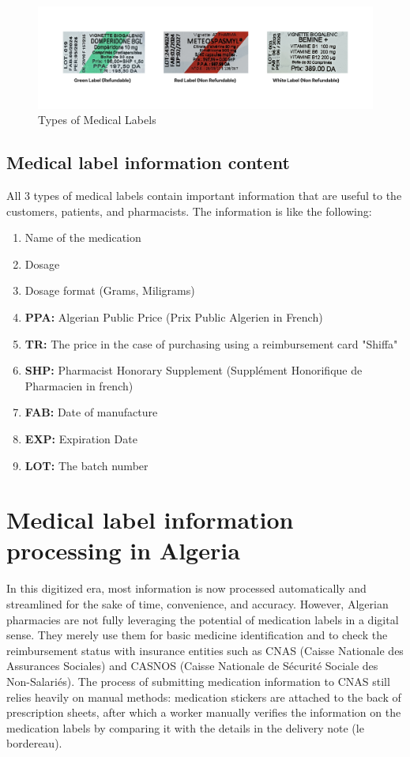 \begin{figure}[H]
    \centering
    \includegraphics[width=\textwidth]{Figures/Chapter 1/labels_types.png}
    \caption{Types of Medical Labels}
    \label{fig:typesofmedicallabels}
\end{figure}

\subsection{Medical label information content}
All 3 types of medical labels contain important information that are useful to the customers, patients, and pharmacists. The information is like the following:

\begin{enumerate}
    \item Name of the medication 
    \item Dosage
    \item Dosage format (Grams, Miligrams)
    \item \textbf{PPA:} Algerian Public Price (Prix Public Algerien in French) 
    \item \textbf{TR:} The price in the case of purchasing using a reimbursement card "Shiffa"
    \item \textbf{SHP:} Pharmacist Honorary Supplement (Supplément Honorifique de Pharmacien in french)
    \item \textbf{FAB:} Date of manufacture
    \item \textbf{EXP:} Expiration Date
    \item \textbf{LOT:} The batch number
\end{enumerate}

\section{Medical label information processing in Algeria}
In this digitized era, most information is now processed automatically and streamlined for the sake of time, convenience, and accuracy. However, Algerian pharmacies are not fully leveraging the potential of medication labels in a digital sense. They merely use them for basic medicine identification and to check the reimbursement status with insurance entities such as CNAS (Caisse Nationale des Assurances Sociales) and CASNOS (Caisse Nationale de Sécurité Sociale des Non-Salariés). The process of submitting medication information to CNAS still relies heavily on manual methods: medication stickers are attached to the back of prescription sheets, after which a worker manually verifies the information on the medication labels by comparing it with the details in the delivery note (le bordereau).

